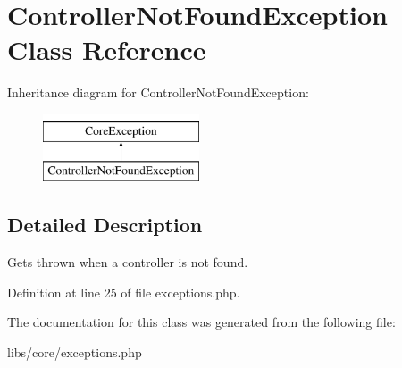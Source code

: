 \hypertarget{class_controller_not_found_exception}{\section{\-Controller\-Not\-Found\-Exception \-Class \-Reference}
\label{class_controller_not_found_exception}
}
\-Inheritance diagram for \-Controller\-Not\-Found\-Exception\-:\begin{figure}[H]
\begin{center}
\leavevmode
\includegraphics[height=2.000000cm]{class_controller_not_found_exception}
\end{center}
\end{figure}


\subsection{\-Detailed \-Description}
\-Gets thrown when a controller is not found. 

\-Definition at line 25 of file exceptions.\-php.



\-The documentation for this class was generated from the following file\-:\begin{DoxyCompactItemize}
\item 
libs/core/exceptions.\-php\end{DoxyCompactItemize}
